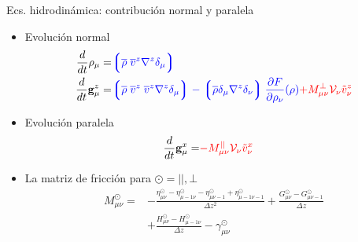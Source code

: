 \documentclass{beamer}
\newcommand{\llg}{\left\lgroup}
\newcommand{\rlg}{\right\rgroup}
\begin{document}
\begin{frame}{Ecs. hidrodinámica: contribución normal y paralela}
\begin{itemize}
  \item<1-> Evolución normal 
\begin{align}
  \frac{d}{dt}\rho_\mu=&  {\color{blue} \llg\overline{\rho} \; \overline{v}^{z}{\nabla}^{z}\delta_\mu \rlg} 
  \nonumber \\
    \frac{d}{dt}{{\bf g}}^{z}_\mu=&
{\color{blue} \llg\overline{\rho}\; \overline{v}^{z}\;\overline{v}^{z}{\nabla}^{z}\delta_{\mu}\rlg
-\llg\overline{\rho}\delta_{\mu}{\nabla}^{z}\delta_{\nu}\rlg
\frac{\partial  F}{\partial \rho_{\nu}}(\rho)}
{\color{red} +M_{\mu\nu}^{\bot}{\cal V}_\nu\tilde{v}^{z}_\nu}
\nonumber
\end{align}
  \item<2-> Evolución paralela 
\begin{align}
  \frac{d}{dt}{{\bf g}}^x_\mu=&{\color{red}-M_{\mu\nu}^{||}{\cal V}_\nu\tilde{v}^x_\nu}
\nonumber
\end{align}
\item<3-> La matriz de fricción para $\odot=||,\bot$
\begin{align}
M^{\odot}_{\mu\nu} 
=&-\frac{\eta^{\odot}_{\mu\nu}-\eta^{\odot}_{\mu-1\nu}-\eta^{\odot}_{\mu\nu-1}+\eta^{\odot}_{\mu-1\nu-1}}{\Delta z^2}
+\frac{{G}^{\odot}_{\mu\nu}-{G}^{\odot}_{\mu\nu-1}}{\Delta z} \nonumber \\
&+\frac{{H}^{\odot}_{\mu\nu}-{H}^{\odot}_{\mu-1\nu}}{\Delta z}
-{\gamma}^{\odot}_{\mu\nu}
\nonumber
\end{align}
\end{itemize}
\end{frame}
\end{document}
